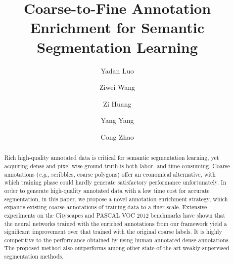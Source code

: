 \documentclass[sigconf]{acmart}
\newcommand{\eat}[1]{}
\begin{document}
\title{Coarse-to-Fine Annotation Enrichment for Semantic Segmentation Learning}
\eat{
\titlenote{}
\subtitle{}
\subtitlenote{}}



\author{Yadan Luo}

\author{Ziwei Wang}

\author{Zi Huang}

\author{Yang Yang}

\author{Cong Zhao}


\renewcommand{\shortauthors}{Luo, Y. et al.}


\begin{abstract}
	Rich high-quality annotated data is critical for semantic segmentation learning, yet acquiring dense and pixel-wise ground-truth is both labor- and time-consuming. Coarse annotations (\textit{e.g.,} scribbles, coarse polygons) offer an economical alternative, with which training phase could hardly generate satisfactory performance unfortunately. In order to generate high-quality annotated data with a low time cost for accurate segmentation, in this paper, we propose a novel annotation enrichment strategy, which expands existing coarse annotations of training data to a finer scale. Extensive experiments on the Cityscapes and PASCAL VOC 2012 benchmarks have shown that the neural networks trained with the enriched annotations from our framework yield a significant improvement over that trained with the original coarse labels. It is highly competitive to the performance obtained by using human annotated dense annotations. The proposed method also outperforms among other state-of-the-art weakly-supervised segmentation methods.
\end{abstract}
\end{document}
